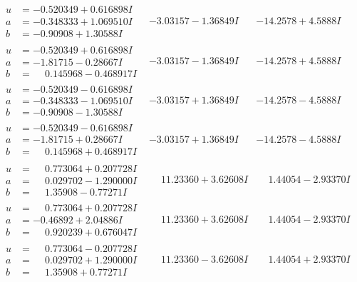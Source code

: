 \documentclass[1p]{elsarticle_modified}
\theoremstyle{definition}
\begin{document}
$$\begin{array}{c|c|c}
\begin{aligned}
u &= -0.520349 + 0.616898 I \\
a &= -0.348333 + 1.069510 I \\
b &= -0.90908 + 1.30588 I\end{aligned}
 & -3.03157 - 1.36849 I & -14.2578 + 4.5888 I \\ \hline\begin{aligned}
u &= -0.520349 + 0.616898 I \\
a &= -1.81715 - 0.28667 I \\
b &= \phantom{-}0.145968 - 0.468917 I\end{aligned}
 & -3.03157 - 1.36849 I & -14.2578 + 4.5888 I \\ \hline\begin{aligned}
u &= -0.520349 - 0.616898 I \\
a &= -0.348333 - 1.069510 I \\
b &= -0.90908 - 1.30588 I\end{aligned}
 & -3.03157 + 1.36849 I & -14.2578 - 4.5888 I \\ \hline\begin{aligned}
u &= -0.520349 - 0.616898 I \\
a &= -1.81715 + 0.28667 I \\
b &= \phantom{-}0.145968 + 0.468917 I\end{aligned}
 & -3.03157 + 1.36849 I & -14.2578 - 4.5888 I \\ \hline\begin{aligned}
u &= \phantom{-}0.773064 + 0.207728 I \\
a &= \phantom{-}0.029702 - 1.290000 I \\
b &= \phantom{-}1.35908 - 0.77271 I\end{aligned}
 & \phantom{-}11.23360 + 3.62608 I & \phantom{-}1.44054 - 2.93370 I \\ \hline\begin{aligned}
u &= \phantom{-}0.773064 + 0.207728 I \\
a &= -0.46892 + 2.04886 I \\
b &= \phantom{-}0.920239 + 0.676047 I\end{aligned}
 & \phantom{-}11.23360 + 3.62608 I & \phantom{-}1.44054 - 2.93370 I \\ \hline\begin{aligned}
u &= \phantom{-}0.773064 - 0.207728 I \\
a &= \phantom{-}0.029702 + 1.290000 I \\
b &= \phantom{-}1.35908 + 0.77271 I\end{aligned}
 & \phantom{-}11.23360 - 3.62608 I & \phantom{-}1.44054 + 2.93370 I \\ \hline\begin{aligned}

\end{aligned}
\end{array}$$
\end{document}
